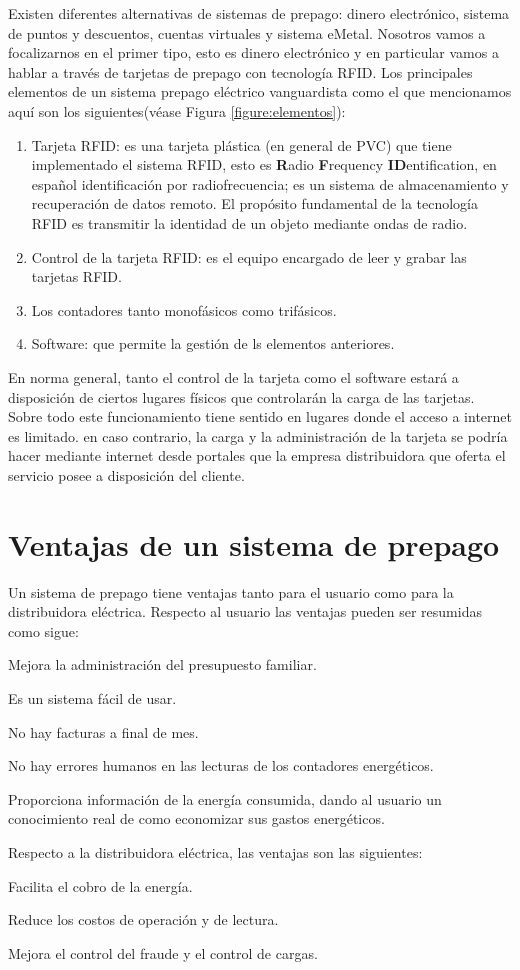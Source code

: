 Existen diferentes alternativas de sistemas de prepago: dinero electrónico, sistema de puntos y descuentos, cuentas virtuales y sistema eMetal. Nosotros vamos a focalizarnos en el primer tipo, esto es dinero electrónico y en particular vamos a hablar a través de tarjetas de prepago con tecnología RFID. Los principales elementos de un sistema prepago eléctrico vanguardista como el que mencionamos aquí son los siguientes(véase Figura \ref{figure:elementos}):
\begin{enumerate}
\item Tarjeta RFID: es una tarjeta plástica (en general de PVC) que tiene implementado el sistema RFID, esto es {\bf R}adio {\bf F}requency {\bf ID}entification, en español identificación por radiofrecuencia; es un sistema de almacenamiento y recuperación de datos remoto. El propósito fundamental de la tecnología RFID es transmitir la identidad de un objeto mediante ondas de radio.
\item Control de la tarjeta RFID: es el equipo encargado de leer y grabar las tarjetas RFID.
\item Los contadores tanto monofásicos como trifásicos.
\item Software: que permite la gestión de ls elementos anteriores.
\end{enumerate}


En norma general, tanto el control de la tarjeta como el software estará a disposición de ciertos lugares físicos que controlarán la carga de las tarjetas. Sobre todo este funcionamiento tiene sentido en lugares donde el acceso a internet es limitado. en caso contrario, la carga y la administración de la tarjeta se podría hacer mediante internet desde portales que la empresa distribuidora que oferta el servicio posee a disposición del cliente.

\section{Ventajas de un sistema de prepago}
Un sistema de prepago tiene ventajas tanto para el usuario como para la distribuidora eléctrica. Respecto al usuario las ventajas pueden ser resumidas como sigue:
\begin{dinglist}{52}
\item Mejora la administración del presupuesto familiar.
\item Es un sistema fácil de usar.
\item No hay facturas a final de mes.
\item No hay errores humanos en las lecturas de los contadores energéticos.
\item Proporciona información de la energía consumida, dando al usuario un conocimiento real de como economizar sus gastos energéticos.
\end{dinglist}
Respecto a la distribuidora eléctrica, las ventajas son las siguientes:
\begin{dinglist}{76}
\item Facilita el cobro de la energía.
\item Reduce los costos de operación y de lectura.
\item Mejora el control del fraude y el control de cargas.
\end{dinglist}

